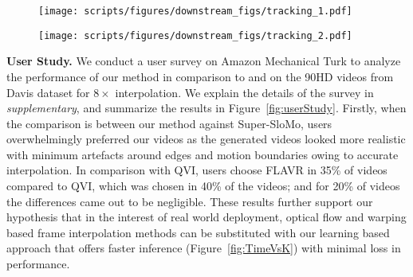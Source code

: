 \documentclass[10pt,twocolumn,letterpaper]{article}
\newcommand{\figref}[1]{Figure~\ref{#1}}
\newcommand{\tabref}[1]{Table~\ref{#1}}
\newcommand{\Ours}{FLAVR}
\newcommand{\eightx}{$8\times$}
\begin{document}
\begin{figure*}[t]
    \begin{center}
    \begin{subfigure}[c]{0.45\textwidth}
        \centering
\texttt{[image: scripts/figures/downstream\_figs/tracking\_1.pdf]}
\end{subfigure}
    \hspace{12pt}
    \begin{subfigure}[c]{0.45\textwidth}
        \centering
        \texttt{[image: scripts/figures/downstream\_figs/tracking\_2.pdf]}
\end{subfigure}


    \end{center}
    \vspace{-16pt}
    \captionsetup{width=\textwidth, font=footnotesize}
    \caption{{\bf Video object segmentation mask propagation on DAVIS}. \Ours{} helps to improve video object tracking in low fps videos. \Ours{} is first used to up-sample video into higher frame rate, then a standard object segment propagation, e.g., CRW~\cite{jabri2020space}, is applied on interpolated videos. Refer \tabref{tab:tracking} for quantitative improvements.}
    \label{fig:downstream}
    \vspace{-16pt}
\end{figure*} 



{\bf User Study.} 
We conduct a user survey on Amazon Mechanical Turk to analyze the performance of our method in comparison to \cite{xu2019quadratic} and \cite{jiang2018super} on the 90HD videos from Davis dataset for \eightx{} interpolation. 
We explain the details of the survey in \emph{supplementary}, and summarize the results in \figref{fig:userStudy}.
Firstly, when the comparison is between our method against Super-SloMo, users overwhelmingly preferred our videos as the generated videos looked more realistic with minimum artefacts around edges and motion boundaries owing to accurate interpolation. In comparison with QVI, users choose \Ours{} in 35\% of videos compared to QVI, which was chosen in 40\% of the videos; and for 20\% of videos the differences came out to be negligible. These results further support our hypothesis that in the interest of real world deployment, optical flow and warping based frame interpolation methods can be substituted with our learning based approach that offers faster inference (\figref{fig:TimeVsK}) with minimal loss in performance.
\end{document}
